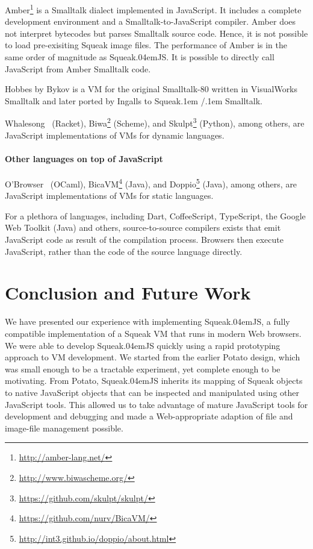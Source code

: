 \documentclass[natbib]{sigplanconf}
\newcommand*\SqueakJS{Squeak\texorpdfstring{\kern.04em}{}JS\xspace}
\newcommand*\SqueakST{Squeak\kern.1em /\kern.1em\penalty0 Smalltalk\xspace}
\newcommand*\JS{JavaScript\xspace}
\begin{document}
Amber\footnote{\url{http://amber-lang.net/}} is a Smalltalk dialect
implemented in \JS. It includes a complete development environment and
a Smalltalk-to-\JS compiler. Amber does not interpret bytecodes but
parses Smalltalk source code. Hence, it is not possible to load
pre-exisiting Squeak image files. The performance of Amber is in the
same order of magnitude as \SqueakJS. It is possible to directly call
\JS from Amber Smalltalk code.

Hobbes by Bykov is a \ac{VM} for the original Smalltalk-80 written in
VisualWorks Smalltalk and later ported by Ingalls to \SqueakST.

Whalesong~\cite{YooKrishnamurthi13} (Racket),
Biwa\footnote{\url{http://www.biwascheme.org/}} (Scheme), and
Skulpt\footnote{\url{https://github.com/skulpt/skulpt/}} (Python),
among others, are \JS implementations of \acp{VM} for dynamic
languages.

\paragraph{Other languages on top of \JS}
\label{sec:other-lang-ontop}

O'Browser~\cite{canou+:2008:obrowser:-objective} (OCaml),
BicaVM\footnote{\url{https://github.com/nurv/BicaVM/}} (Java), and
Doppio\footnote{\url{http://int3.github.io/doppio/about.html}} (Java), among
others, are \JS implementations of \acp{VM} for static languages.

For a plethora of languages, including Dart, CoffeeScript, TypeScript,
the Google Web Toolkit (Java) and others, source-to-source compilers
exists that emit \JS code as result of the compilation
process. Browsers then execute \JS, rather than the code of the source
language directly.

\section{Conclusion and Future Work}
\label{sec:conclusion}

We have presented our experience with implementing \SqueakJS, a fully
compatible implementation of a Squeak \ac{VM} that runs in modern Web
browsers. We were able to develop \SqueakJS quickly using a rapid
prototyping approach to \ac{VM} development. We started from the
earlier Potato design, which was small enough to be a tractable
experiment, yet complete enough to be motivating. From Potato,
\SqueakJS inherits its mapping of Squeak objects to native \JS objects
that can be inspected and manipulated using other \JS tools. This
allowed us to take advantage of mature \JS tools for development and
debugging and made a Web-appropriate adaption of file and image-file
management possible.
\end{document}
